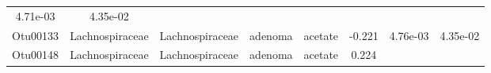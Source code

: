 \documentclass[11pt,]{article}
\begin{document}
\begin{longtable}[]{@{}cccccccc@{}}
\begin{minipage}[t]{0.08\columnwidth}
4.71e-03\strut
\end{minipage} & \begin{minipage}[t]{0.08\columnwidth}\centering\strut
4.35e-02\strut
\end{minipage}\tabularnewline
\begin{minipage}[t]{0.08\columnwidth}\centering\strut
Otu00133\strut
\end{minipage} & \begin{minipage}[t]{0.15\columnwidth}\centering\strut
Lachnospiraceae\strut
\end{minipage} & \begin{minipage}[t]{0.15\columnwidth}\centering\strut
Lachnospiraceae\strut
\end{minipage} & \begin{minipage}[t]{0.08\columnwidth}\centering\strut
adenoma\strut
\end{minipage} & \begin{minipage}[t]{0.09\columnwidth}\centering\strut
acetate\strut
\end{minipage} & \begin{minipage}[t]{0.07\columnwidth}\centering\strut
-0.221\strut
\end{minipage} & \begin{minipage}[t]{0.08\columnwidth}\centering\strut
4.76e-03\strut
\end{minipage} & \begin{minipage}[t]{0.08\columnwidth}\centering\strut
4.35e-02\strut
\end{minipage}\tabularnewline
\begin{minipage}[t]{0.08\columnwidth}\centering\strut
Otu00148\strut
\end{minipage} & \begin{minipage}[t]{0.15\columnwidth}\centering\strut
Lachnospiraceae\strut
\end{minipage} & \begin{minipage}[t]{0.15\columnwidth}\centering\strut
Lachnospiraceae\strut
\end{minipage} & \begin{minipage}[t]{0.08\columnwidth}\centering\strut
adenoma\strut
\end{minipage} & \begin{minipage}[t]{0.09\columnwidth}\centering\strut
acetate\strut
\end{minipage} & \begin{minipage}[t]{0.07\columnwidth}\centering\strut
0.224\strut
\end{minipage} & \begin{minipage}[t]{0.08\columnwidth}\centering\strut

\end{minipage}
\end{longtable}
\end{document}

